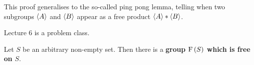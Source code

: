 \begin{remark*}
This proof generalises to the so-called ping pong lemma, telling when two subgroups $ \left\langle A \right\rangle $ and $ \left\langle B \right\rangle $ appear as a free product $ \left\langle A \right\rangle * \left\langle B \right\rangle $.
\end{remark*}


Lecture 6 is a problem class.

\pagebreak


\begin{proposition}
Let $ S $ be an arbitrary non-empty set. Then there is a \textbf{group $ \F\br{S} $ which is free on $ S $}.
\end{proposition}

